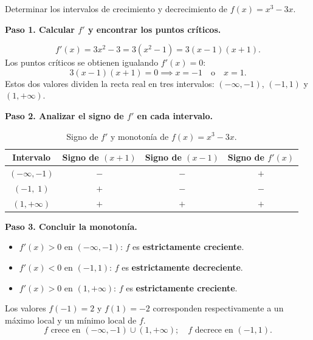 \begin{example}[Monotonía de $f(x)=x^3-3x$]
Determinar los intervalos de crecimiento y decrecimiento de
$f(x)=x^3-3x$.
\begin{myproof}
\textbf{Paso 1. Calcular $f'$ y encontrar los puntos críticos.}

\[
f'(x) = 3x^2 - 3 = 3(x^2-1) = 3(x-1)(x+1).
\]
Los puntos críticos se obtienen igualando $f'(x)=0$:
\[
3(x-1)(x+1)=0 \implies x=-1 \quad \text{o} \quad x=1.
\]
Estos dos valores dividen la recta real en tres intervalos:
$(-\infty,-1)$, $(-1,1)$ y $(1,+\infty)$.

\textbf{Paso 2. Analizar el signo de $f'$ en cada intervalo.}

\begin{table}[H]
\centering
\begin{tabular}{c c c c}
\toprule
Intervalo & Signo de $(x+1)$ & Signo de $(x-1)$ & Signo de $f'(x)$ \\
\midrule
$(-\infty,-1)$ & $-$ & $-$ & $+$ \\
$(-1,\;1)$     & $+$ & $-$ & $-$ \\
$(1,+\infty)$  & $+$ & $+$ & $+$ \\
\bottomrule
\end{tabular}
\caption{Signo de $f'$ y monotonía de $f(x)=x^3-3x$.}
\end{table}

\textbf{Paso 3. Concluir la monotonía.}

\begin{itemize}
    \item $f'(x)>0$ en $(-\infty,-1)$: $f$ es \textbf{estrictamente
    creciente}.
    \item $f'(x)<0$ en $(-1,1)$: $f$ es \textbf{estrictamente
    decreciente}.
    \item $f'(x)>0$ en $(1,+\infty)$: $f$ es \textbf{estrictamente
    creciente}.
\end{itemize}

Los valores $f(-1)=2$ y $f(1)=-2$ corresponden respectivamente a un
máximo local y un mínimo local de $f$.
\[
\boxed{f\text{ crece en }(-\infty,-1)\cup(1,+\infty);\quad f\text{ decrece en }(-1,1).}
\]

\begin{figure}[H]
\centering
\begin{tikzpicture}[>=stealth, scale=0.9]


\end{tikzpicture}
\end{figure}
\end{myproof}
\end{example}
